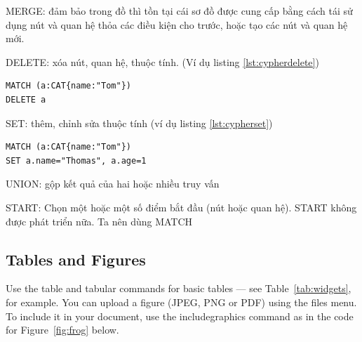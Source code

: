 MERGE: đảm bảo trong đồ thì tồn tại cái sơ đồ được cung cấp bằng cách tái sử dụng nút và quan hệ thỏa các điều kiện cho trước, hoặc tạo các nút và quan hệ mới. 

DELETE: xóa nút, quan hệ, thuộc tính. (Ví dụ listing \ref{lst:cypherdelete})
\begin{lstlisting}[caption={Cypher xóa}, label={lst:cypherdelete}]
MATCH (a:CAT{name:"Tom"})
DELETE a
\end{lstlisting}

SET: thêm, chỉnh sửa thuộc tính (ví dụ listing \ref{lst:cypherset})
\begin{lstlisting}[caption={Cypher sửa}, label={lst:cypherset}]
MATCH (a:CAT{name:"Tom"})
SET a.name="Thomas", a.age=1
\end{lstlisting}

UNION: gộp kết quả của hai hoặc nhiều truy vấn 

START: Chọn một hoặc một số điểm bắt đầu (nút hoặc quan hệ). START không được phát triển nữa. Ta nên dùng MATCH 








\subsection{Tables and Figures}

Use the table and tabular commands for basic tables --- see Table~\ref{tab:widgets}, for example. You can upload a figure (JPEG, PNG or PDF) using the files menu. To include it in your document, use the includegraphics command as in the code for Figure~\ref{fig:frog} below.



